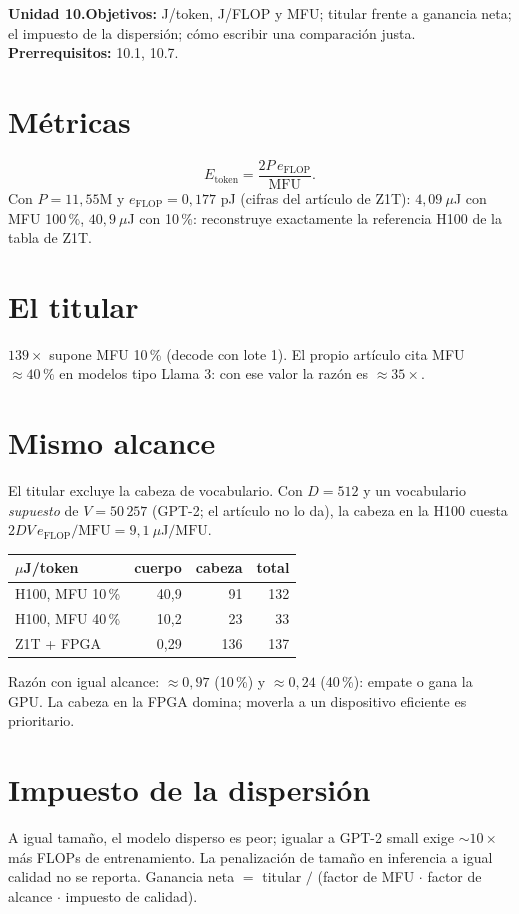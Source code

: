 \documentclass[11pt,a4paper]{article}
\begin{document}

\noindent\textbf{Unidad 10.}\quad\textbf{Objetivos:} J/token, J/FLOP y MFU; titular frente a ganancia neta; el impuesto de la dispersión; cómo escribir una comparación justa.
\textbf{Prerrequisitos:} 10.1, 10.7.

\section{Métricas}
\[E_{\text{token}}=\frac{2P\,e_{\text{FLOP}}}{\text{MFU}}.\]
Con $P=11{,}55$M y $e_{\text{FLOP}}=0{,}177$ pJ (cifras del artículo de Z1T): $4{,}09\ \mu$J con MFU 100\,\%, $40{,}9\ \mu$J con 10\,\%: reconstruye exactamente la referencia
H100 de la tabla de Z1T.

\section{El titular \evP}
$139\times$ supone MFU 10\,\% (decode con lote 1). El propio artículo cita MFU $\approx40\,\%$ en modelos tipo Llama 3: con ese valor la razón es $\approx35\times$.

\section{Mismo alcance \evE}
El titular excluye la cabeza de vocabulario. Con $D=512$ y un vocabulario \emph{supuesto} de $V=50\,257$ (GPT-2; el artículo no lo da), la cabeza en la H100 cuesta
$2DV\,e_{\text{FLOP}}/\text{MFU}=9{,}1\ \mu$J$/\text{MFU}$.
\begin{center}\small\begin{tabular}{lrrr}\toprule
$\mu$J/token & cuerpo & cabeza & total\\\midrule
H100, MFU 10\,\% & 40{,}9 & 91 & 132\\ H100, MFU 40\,\% & 10{,}2 & 23 & 33\\ Z1T + FPGA & 0{,}29 & 136 & 137\\\bottomrule
\end{tabular}\end{center}
Razón con igual alcance: $\approx0{,}97$ (10\,\%) y $\approx0{,}24$ (40\,\%): empate o gana la GPU. La cabeza en la FPGA domina; moverla a un dispositivo eficiente es prioritario.

\section{Impuesto de la dispersión \evP}
A igual tamaño, el modelo disperso es peor; igualar a GPT-2 small exige $\sim10\times$ más FLOPs de entrenamiento. La penalización de tamaño en inferencia a igual calidad no se
reporta. Ganancia neta $=$ titular $/$ (factor de MFU $\cdot$ factor de alcance $\cdot$ impuesto de calidad).
\end{document}
